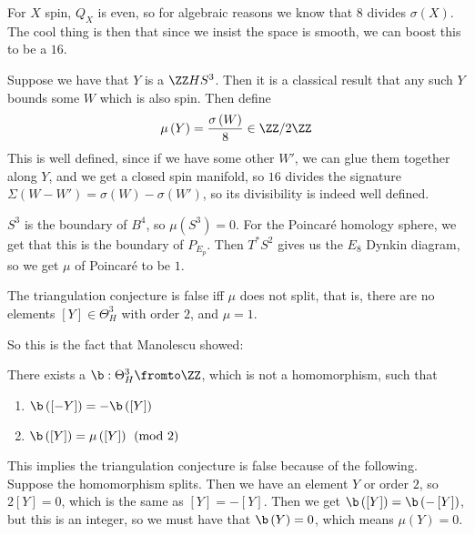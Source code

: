 \documentclass{amsart}
\begin{document}
\begin{rmk}
For $X$ spin, $Q_X$ is even, so for algebraic reasons
we know that $8$ divides $\sigma\left( X \right)$. 
The cool thing is then that since we insist the space is smooth, we
can boost this to be a $16$.
\end{rmk}

Suppose we have that $Y$ is a $\ZZ H S^3$. 
Then it is a classical result that any such $Y$ bounds
some $W$ which is also spin. 
Then define
\begin{equation}
\mu\left( Y \right) = \frac{\sigma\left( W \right)}{8}\in \ZZ / 2\ZZ
\end{equation}
This is well defined, since if we have some other $W'$, 
we can glue them together along $Y$, 
and we get a closed spin manifold, so $16$ divides the signature
$\Sigma\left( W\minus W' \right) = \sigma\left( W \right) - \sigma\left( W' \right)$, 
so its divisibility is indeed well defined.

\begin{exm}
$S^3$ is the boundary of $B^4$, so $\mu\left( S^3 \right)= 0$. 
For the Poincar\'e homology sphere, we get that this is the boundary of $P_{E_p}$.
Then $T^*S^2$ gives us the $E_8$ Dynkin diagram, so we get $\mu$ of Poincar\'e
to be $1$.
\end{exm}

\begin{thm}
The triangulation conjecture is false iff
$\mu$ does not split, that is, 
there are no elements $\left[ Y \right]\in \Theta_H^3$ with order $2$, 
and $\mu = 1$.
\end{thm}

So this is the fact that Manolescu showed:

\begin{thm}[Manolescu]
There exists a $\b:\Theta_H^3\fromto \ZZ$, which is not a homomorphism, such that
\begin{enumerate}
\item $\b\left( \left[- Y \right] \right) = -\b\left( \left[ Y \right] \right)$
\item $\b\left( \left[ Y \right] \right) = \mu\left( \left[ Y \right] \right)\pmod{2}$
\end{enumerate}
\label{thm:mano}
\end{thm}

This implies the triangulation conjecture is false because of the following. 
Suppose the homomorphism splits. 
Then we have an element $Y$ or order $2$, so
$2\left[ Y \right] = 0$, 
which is the same as $\left[ Y \right] = -\left[ Y \right]$.
Then we get $\b\left( \left[ Y \right] \right) = \b\left( -\left[ Y \right] \right)$,
but this is an integer, so we must have that $\b\left( Y \right) = 0$, 
which means $\mu\left( Y \right) = 0$.
\end{document}
